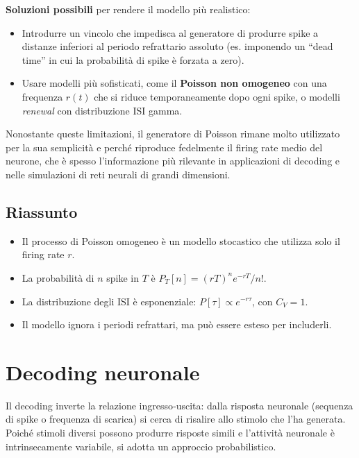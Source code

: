 \textbf{Soluzioni possibili} per rendere il modello più realistico:
\begin{itemize}
    \item Introdurre un vincolo che impedisca al generatore di produrre spike a distanze inferiori al periodo refrattario assoluto (es. imponendo un ``dead time'' in cui la probabilità di spike è forzata a zero).
    \item Usare modelli più sofisticati, come il \textbf{Poisson non omogeneo} con una frequenza $r(t)$ che si riduce temporaneamente dopo ogni spike, o modelli \textit{renewal} con distribuzione ISI gamma.
\end{itemize}

Nonostante queste limitazioni, il generatore di Poisson rimane molto utilizzato per la sua semplicità e perché riproduce fedelmente il firing rate medio del neurone, che è spesso l'informazione più rilevante in applicazioni di decoding e nelle simulazioni di reti neurali di grandi dimensioni.

\subsection{Riassunto}
\begin{itemize}
    \item Il processo di Poisson omogeneo è un modello stocastico che utilizza solo il firing rate $r$.
    \item La probabilità di $n$ spike in $T$ è $P_T[n] = (rT)^n e^{-rT}/n!$.
    \item La distribuzione degli ISI è esponenziale: $P[\tau] \propto e^{-r\tau}$, con $C_V = 1$.
    \item Il modello ignora i periodi refrattari, ma può essere esteso per includerli.
\end{itemize}

\section{Decoding neuronale}

Il decoding inverte la relazione ingresso‑uscita: dalla risposta neuronale (sequenza di spike o frequenza di scarica) si cerca di risalire allo stimolo che l’ha generata. Poiché stimoli diversi possono produrre risposte simili e l’attività neuronale è intrinsecamente variabile, si adotta un approccio probabilistico.

